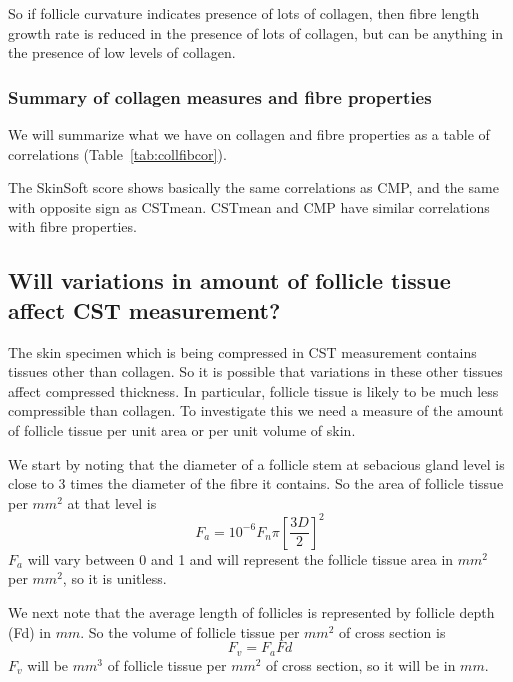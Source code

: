\documentclass[titlepage]{article}  %
\begin{document}
So if follicle curvature indicates presence of lots of collagen, then fibre length growth rate is reduced in the presence of lots of collagen, but can be anything in the presence of low levels of collagen.


\subsubsection{Summary of collagen measures and fibre properties}


We will summarize what we have on collagen and fibre properties as a table of correlations (Table~\ref{tab:collfibcor}).

The SkinSoft score shows basically the same correlations as CMP, and the same with opposite sign as CSTmean. CSTmean and CMP have similar correlations with fibre properties.

\subsection{Will variations in amount of follicle tissue affect CST measurement?}
The skin specimen which is being compressed in CST measurement contains tissues other than collagen. So it is possible that variations in these other tissues affect compressed thickness. In particular, follicle tissue is likely to be much less compressible than collagen. To investigate this we need a measure of the amount of follicle tissue per unit area or per unit volume of skin. 

We start by noting that the diameter of a follicle stem at sebacious gland level is close to 3 times the diameter of the fibre it contains. So the area of follicle tissue per $mm^{2}$ at that level is
\begin{displaymath}
F_{a} = 10^{-6} F_{n} \pi \left[\frac{3D}{2}\right]^{2}
\end{displaymath}
$F_{a}$ will vary between 0 and 1 and will represent the follicle tissue area in $mm^{2}$ per $mm^{2}$, so it is unitless. 

We next note that the average length of follicles is represented by follicle depth (Fd) in $mm$.  So the volume of follicle tissue per $mm^{2}$  of cross section is 
\begin{displaymath}
F_{v} = F_{a} Fd
\end{displaymath}
$F_{v}$ will be $mm^{3}$ of follicle tissue per $mm^{2}$ of cross section, so it will be in $mm$. 
\end{document}
